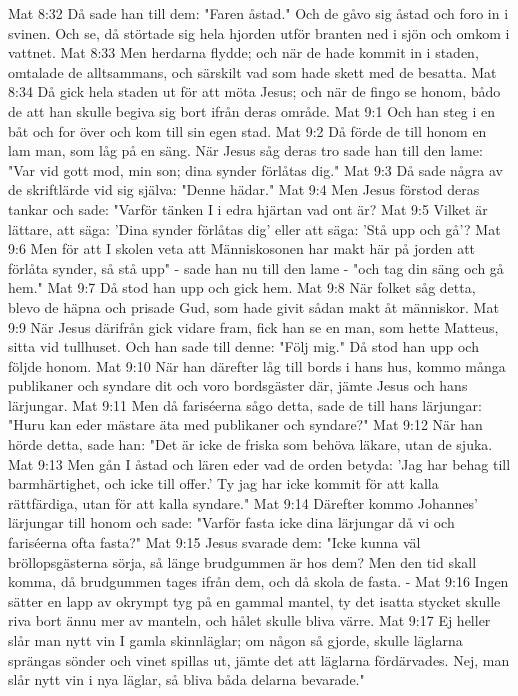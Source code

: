 Mat 8:32  Då sade han till dem: "Faren åstad." Och de gåvo sig åstad och foro in i svinen. Och se, då störtade sig hela hjorden utför branten ned i sjön och omkom i vattnet.
Mat 8:33  Men herdarna flydde; och när de hade kommit in i staden, omtalade de alltsammans, och särskilt vad som hade skett med de besatta.
Mat 8:34  Då gick hela staden ut för att möta Jesus; och när de fingo se honom, bådo de att han skulle begiva sig bort ifrån deras område.
Mat 9:1  Och han steg i en båt och for över och kom till sin egen stad.
Mat 9:2  Då förde de till honom en lam man, som låg på en säng. När Jesus såg deras tro sade han till den lame: "Var vid gott mod, min son; dina synder förlåtas dig."
Mat 9:3  Då sade några av de skriftlärde vid sig själva: "Denne hädar."
Mat 9:4  Men Jesus förstod deras tankar och sade: "Varför tänken I i edra hjärtan vad ont är?
Mat 9:5  Vilket är lättare, att säga: 'Dina synder förlåtas dig' eller att säga: 'Stå upp och gå'?
Mat 9:6  Men för att I skolen veta att Människosonen har makt här på jorden att förlåta synder, så stå upp" - sade han nu till den lame - "och tag din säng och gå hem."
Mat 9:7  Då stod han upp och gick hem.
Mat 9:8  När folket såg detta, blevo de häpna och prisade Gud, som hade givit sådan makt åt människor.
Mat 9:9  När Jesus därifrån gick vidare fram, fick han se en man, som hette Matteus, sitta vid tullhuset. Och han sade till denne: "Följ mig." Då stod han upp och följde honom.
Mat 9:10  När han därefter låg till bords i hans hus, kommo många publikaner och syndare dit och voro bordsgäster där, jämte Jesus och hans lärjungar.
Mat 9:11  Men då fariséerna sågo detta, sade de till hans lärjungar: "Huru kan eder mästare äta med publikaner och syndare?"
Mat 9:12  När han hörde detta, sade han: "Det är icke de friska som behöva läkare, utan de sjuka.
Mat 9:13  Men gån I åstad och lären eder vad de orden betyda: 'Jag har behag till barmhärtighet, och icke till offer.' Ty jag har icke kommit för att kalla rättfärdiga, utan för att kalla syndare."
Mat 9:14  Därefter kommo Johannes' lärjungar till honom och sade: "Varför fasta icke dina lärjungar då vi och fariséerna ofta fasta?"
Mat 9:15  Jesus svarade dem: "Icke kunna väl bröllopsgästerna sörja, så länge brudgummen är hos dem? Men den tid skall komma, då brudgummen tages ifrån dem, och då skola de fasta. -
Mat 9:16  Ingen sätter en lapp av okrympt tyg på en gammal mantel, ty det isatta stycket skulle riva bort ännu mer av manteln, och hålet skulle bliva värre.
Mat 9:17  Ej heller slår man nytt vin I gamla skinnläglar; om någon så gjorde, skulle läglarna sprängas sönder och vinet spillas ut, jämte det att läglarna fördärvades. Nej, man slår nytt vin i nya läglar, så bliva båda delarna bevarade."

